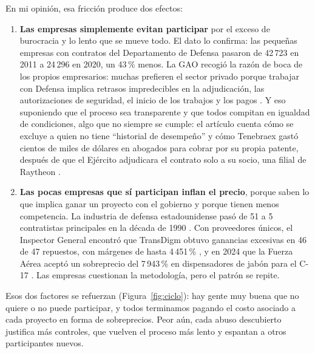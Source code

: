 \documentclass[11pt,letterpaper]{article}
\begin{document}
En mi opinión, esa fricción produce dos efectos:

\begin{enumerate}[label=\arabic*., leftmargin=1.6em, itemsep=0.35em]
  \item \textbf{Las empresas simplemente evitan participar} por el exceso de
    burocracia y lo lento que se mueve todo. El dato lo confirma: las
    pequeñas empresas con contratos del Departamento de Defensa pasaron de
    42\,723 en 2011 a 24\,296 en 2020, un 43\,\% menos. La GAO recogió la
    razón de boca de los propios empresarios: muchas prefieren el sector
    privado porque trabajar con Defensa implica retrasos impredecibles en la
    adjudicación, las autorizaciones de seguridad, el inicio de los trabajos
    y los pagos \parencite{gao2021}. Y eso suponiendo que el proceso sea
    transparente y que todos compitan en igualdad de condiciones, algo que
    no siempre se cumple: el artículo cuenta cómo se excluye a quien no
    tiene \enquote{historial de desempeño} y cómo Tenebraex gastó cientos
    de miles de dólares en abogados para cobrar por su propia patente,
    después de que el Ejército adjudicara el contrato solo a su socio, una
    filial de Raytheon \parencite{somers2019}.
  \item \textbf{Las pocas empresas que sí participan inflan el precio},
    porque saben lo que implica ganar un proyecto con el gobierno y porque
    tienen menos competencia. La industria de defensa estadounidense pasó de
    51 a 5 contratistas principales en la década de 1990 \parencite{dod2022}.
    Con proveedores únicos, el Inspector General encontró que TransDigm
    obtuvo ganancias excesivas en 46 de 47 repuestos, con márgenes de hasta
    4\,451\,\% \parencite{dodig2019}, y en 2024 que la Fuerza Aérea aceptó un
    sobreprecio del 7\,943\,\% en dispensadores de jabón para el C-17
    \parencite{dodig2024}. Las empresas cuestionan la metodología, pero el
    patrón se repite.
\end{enumerate}

Esos dos factores se refuerzan (Figura~\ref{fig:ciclo}): hay gente muy
buena que no quiere o no puede participar, y todos terminamos pagando el
costo asociado a cada proyecto en forma de sobreprecios. Peor aún, cada
abuso descubierto justifica más controles, que vuelven el proceso más lento
y espantan a otros participantes nuevos.
\end{document}

